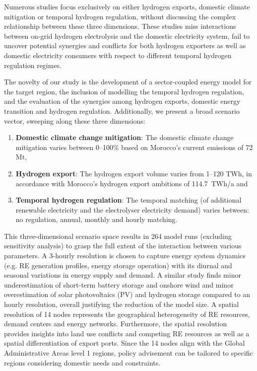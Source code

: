 Numerous studies focus exclusively on either hydrogen exports, domestic climate mitigation or temporal hydrogen regulation, without discussing the complex relationship between these three dimensions. These studies miss interactions between on-grid hydrogen electrolysis and the domestic electricity system, fail to uncover potential synergies and conflicts for both hydrogen exporters as well as domestic electricity consumers with respect to different temporal hydrogen regulation regimes.


The novelty of our study is the development of a sector-coupled energy model for the target region, the inclusion of modelling the temporal hydrogen regulation, and the evaluation of the synergies among hydrogen exports, domestic energy transition and hydrogen regulation.
Additionally, we present a broad scenario vector, sweeping along these three dimensions:
\begin{enumerate}
    \item \textbf{Domestic climate change mitigation}: The domestic climate change mitigation varies between 0--100\% based on Morocco's current emissions of 72 Mt\coe,
    \item \textbf{Hydrogen export}: The hydrogen export volume varies from 1--120 TWh, in accordance with Morocco's hydrogen export ambitions of 114.7~TWh/a and
    \item \textbf{Temporal hydrogen regulation}: The temporal matching (of additional renewable electricity and the electrolyser electricity demand) varies between: no regulation, annual, monthly and hourly matching.
\end{enumerate}
This three-dimensional scenario space results in 264 model runs (excluding sensitivity analysis) to grasp the full extent of the interaction between various parameters.
A 3-hourly resolution is chosen to capture energy system dynamics (e.g. RE generation profiles, energy storage operation) with its diurnal and seasonal variations in energy supply and demand. A similar study \cite{Neumann2022} finds minor underestimation of short-term battery storage and onshore wind and minor overestimation of solar photovoltaics (PV) and hydrogen storage compared to an hourly resolution, overall justifying the reduction of the model size. 
A spatial resolution of 14 nodes represents the geographical heterogeneity of RE resources, demand centers and energy networks. Furthermore, the spatial resolution provides insights into land use conflicts and competing RE resources as well as a spatial differentiation of export ports. Since the 14 nodes align with the Global Administrative Areas level 1 regions, policy advisement can be tailored to specific regions considering domestic needs and constraints.


